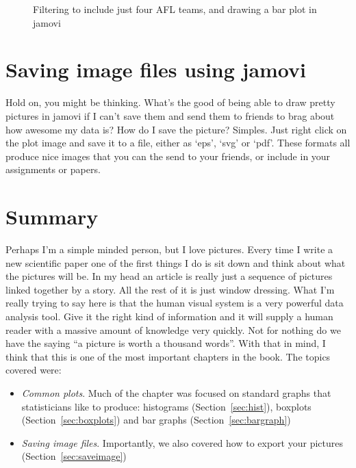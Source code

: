 \vspace{0.5cm}
\begin{figure}[htp]
\begin{center}
\caption{Filtering to include just four AFL teams, and drawing a bar plot in jamovi}
\label{fig:bar1}
\HR
\end{center}
\end{figure}

\section{Saving image files using jamovi~\label{sec:saveimage}}

Hold on, you might be thinking. What's the good of being able to draw pretty pictures in jamovi if I can't save them and send them to friends to brag about how awesome my data is? How do I save the picture? Simples. Just right click on the plot image and save it to a file, either as `eps', `svg' or `pdf'. These formats all produce nice images that you can the send to your friends, or include in your assignments or papers.


\section{Summary}

Perhaps I'm a simple minded person, but I love pictures. Every time I write a new scientific paper one of the first things I do is sit down and think about what the pictures will be. In my head an article is really just a sequence of pictures linked together by a story. All the rest of it is just window dressing. What I'm really trying to say here is that the human visual system is a very powerful data analysis tool. Give it the right kind of information and it will supply a human reader with a massive amount of knowledge very quickly. Not for nothing do we have the saying ``a picture is worth a thousand words''. With that in mind, I think that this is one of the most important chapters in the book. The topics covered were:

\begin{itemize}
\item {\it Common plots}. Much of the chapter was focused on standard graphs that statisticians like to produce: histograms (Section~\ref{sec:hist}), boxplots (Section~\ref{sec:boxplots}) and bar graphs (Section~\ref{sec:bargraph}) 
\item {\it Saving image files}. Importantly, we also covered how to export your pictures (Section~\ref{sec:saveimage})
\end{itemize} 

